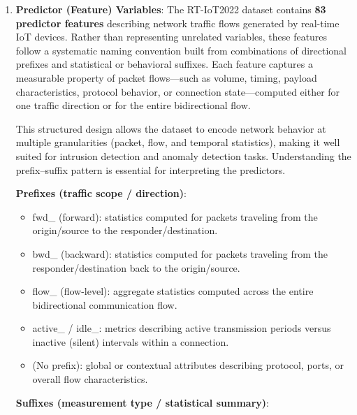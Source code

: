\documentclass[
  8pt,
  letterpaper,
  DIV=11,
  numbers=noendperiod]{scrreprt}
\providecommand{\tightlist}{%
  \setlength{\itemsep}{0pt}\setlength{\parskip}{0pt}}
\begin{document}
\begin{enumerate}
\def\labelenumi{\arabic{enumi})}
\item
  \textbf{Predictor (Feature) Variables}: The RT-IoT2022 dataset
  contains \textbf{83 predictor features} describing network traffic
  flows generated by real-time IoT devices. Rather than representing
  unrelated variables, these features follow a systematic naming
  convention built from combinations of directional prefixes and
  statistical or behavioral suffixes. Each feature captures a measurable
  property of packet flows---such as volume, timing, payload
  characteristics, protocol behavior, or connection state---computed
  either for one traffic direction or for the entire bidirectional flow.

  This structured design allows the dataset to encode network behavior
  at multiple granularities (packet, flow, and temporal statistics),
  making it well suited for intrusion detection and anomaly detection
  tasks. Understanding the prefix--suffix pattern is essential for
  interpreting the predictors.

  \textbf{Prefixes (traffic scope / direction)}:

  \begin{itemize}
  \tightlist
  \item
    fwd\_ (forward): statistics computed for packets traveling from the
    origin/source to the responder/destination.
  \item
    bwd\_ (backward): statistics computed for packets traveling from the
    responder/destination back to the origin/source.
  \item
    flow\_ (flow-level): aggregate statistics computed across the entire
    bidirectional communication flow.
  \item
    active\_ / idle\_: metrics describing active transmission periods
    versus inactive (silent) intervals within a connection.
  \item
    (No prefix): global or contextual attributes describing protocol,
    ports, or overall flow characteristics.
  \end{itemize}

  \textbf{Suffixes (measurement type / statistical summary)}:


\end{enumerate}
\end{document}
